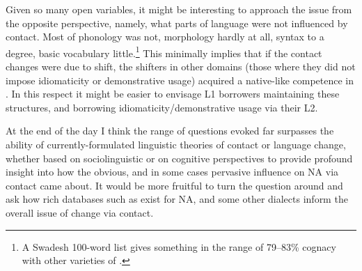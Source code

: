\documentclass[output=paper]{langsci/langscibook}
\begin{document}
Given so many open variables, it might be interesting to approach the issue from the opposite perspective, namely, what parts of language were not influenced by contact. Most of phonology was not, morphology hardly at all, syntax to a degree, basic vocabulary little.\footnote{A Swadesh 100-word list gives something in the range of 79–83\% cognacy with   other varieties of .} This minimally implies that if the contact changes were due to shift, the shifters in other domains (those where they did not impose {idiomaticity} or demonstrative usage) acquired a native-like competence in . In this respect it might be easier to envisage L1  borrowers maintaining these structures, and borrowing {idiomaticity}/demonstrative usage via their L2.

At the end of the day I think the range of {questions} evoked far surpasses the ability of currently-formulated linguistic theories of contact or {language change}, whether based on sociolinguistic or on cognitive perspectives \citep[523]{Lucas2015} to provide profound insight into how the obvious, and in some cases pervasive influence on NA via contact came about. It would be more fruitful to turn the question around and ask how rich databases such as exist for NA,  and some other  dialects inform the overall issue of change via contact.
\end{document}
